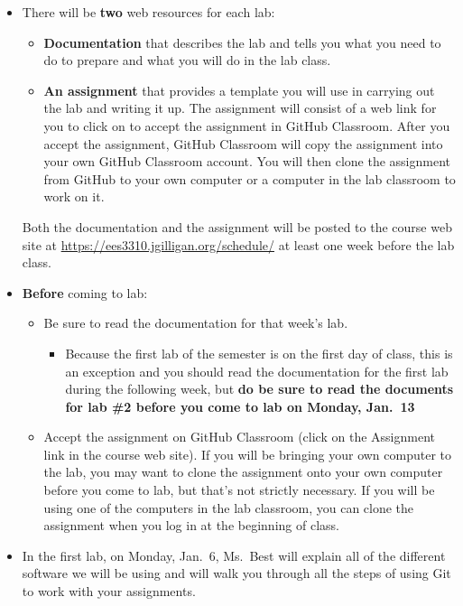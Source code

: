 \documentclass[
]{article}
\providecommand{\tightlist}{%
  \setlength{\itemsep}{0pt}\setlength{\parskip}{0pt}}
\begin{document}
\begin{itemize}
\tightlist
\item
  There will be \textbf{two} web resources for each lab:

  \begin{itemize}
  \tightlist
  \item
    \textbf{Documentation} that describes the lab and tells you what you
    need to do to prepare and what you will do in the lab class.
  \item
    \textbf{An assignment} that provides a template you will use in
    carrying out the lab and writing it up. The assignment will consist
    of a web link for you to click on to accept the assignment in GitHub
    Classroom. After you accept the assignment, GitHub Classroom will
    copy the assignment into your own GitHub Classroom account. You will
    then clone the assignment from GitHub to your own computer or a
    computer in the lab classroom to work on it.
  \end{itemize}

  Both the documentation and the assignment will be posted to the course
  web site at \url{https://ees3310.jgilligan.org/schedule/} at least one
  week before the lab class.
\item
  \textbf{Before} coming to lab:

  \begin{itemize}
  \tightlist
  \item
    Be sure to read the documentation for that week's lab.

    \begin{itemize}
    \tightlist
    \item
      Because the first lab of the semester is on the first day of
      class, this is an exception and you should read the documentation
      for the first lab during the following week, but \textbf{do be
      sure to read the documents for lab \#2 before you come to lab on
      Monday, Jan.~13}
    \end{itemize}
  \item
    Accept the assignment on GitHub Classroom (click on the Assignment
    link in the course web site). If you will be bringing your own
    computer to the lab, you may want to clone the assignment onto your
    own computer before you come to lab, but that's not strictly
    necessary. If you will be using one of the computers in the lab
    classroom, you can clone the assignment when you log in at the
    beginning of class.
  \end{itemize}
\item
  In the first lab, on Monday, Jan.~6, Ms.~Best will explain all of the
  different software we will be using and will walk you through all the
  steps of using Git to work with your assignments.
\end{itemize}
\end{document}

